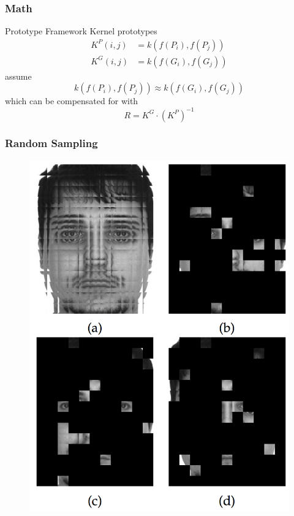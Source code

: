 \documentclass{beamer}
\begin{document}
\begin{frame}
\frametitle{Math}
\begin{block}{Prototype Framework}
Kernel prototypes
\begin{equation}
\begin{split}
K^P(i,j) &= k(f(P_i), f(P_j)) \\
K^G(i,j) &= k(f(G_i), f(G_j))
\end{split}
\end{equation}
assume
\begin{equation}
k(f(P_i), f(P_j)) \approx k(f(G_i), f(G_j))
\end{equation}
which can be compensated for with
\begin{equation}
R = K^G \cdot (K^P)^{-1}
\end{equation}
\end{block}
\end{frame}

\begin{frame}
\frametitle{Random Sampling}
\begin{figure}
\includegraphics[height=.85\textheight]{randomsampling}
\end{figure}
\end{frame}
\end{document}
